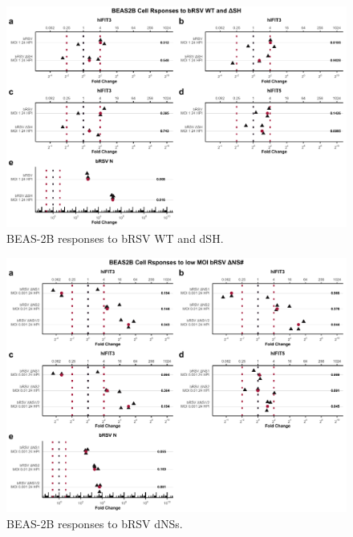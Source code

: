 \begin{figure}
    \centering
    \includegraphics[width=1\linewidth]{06. Chapter 1/Figs/01. Induction/11. beas2b_brsv_moi1.pdf}
    \caption[BEAS-2B responses to bRSV WT and dSH.]{BEAS-2B responses to bRSV WT and dSH.}
    \label{BEAS-2B responses to bRSV WT and dSH.}
\end{figure}

\begin{figure}
    \centering
    \includegraphics[width=1\linewidth]{06. Chapter 1/Figs/01. Induction/12. beas2b_brsv_dns.pdf}
    \caption[BEAS-2B responses to bRSV dNSs.]{BEAS-2B responses to bRSV dNSs.}
    \label{BEAS-2B responses to bRSV dNSs.}
\end{figure}










